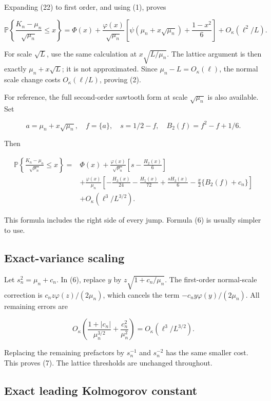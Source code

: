 \documentclass[
  11pt,
]{article}
\begin{document}
Expanding (22) to first order, and using (1), proves

\[
\mathbb P\left\{\frac{K_n-\mu_n}{\sqrt{\mu_n}}\le x\right\}
=\Phi(x)+\frac{\varphi(x)}{\sqrt{\mu_n}}
\left[\psi(\mu_n+x\sqrt{\mu_n})+\frac{1-x^2}{6}\right]
+O_\kappa(\ell^2/L).
\tag{25}
\]

For scale \(\sqrt L\), use the same calculation at \(x\sqrt{L/\mu_n}\).
The lattice argument is then exactly \(\mu_n+x\sqrt L\); it is not
approximated. Since \(\mu_n-L=O_\kappa(\ell)\), the normal scale change
costs \(O_\kappa(\ell/L)\), proving (2).

For reference, the full second-order sawtooth form at scale
\(\sqrt{\mu_n}\) is also available. Set

\[
a=\mu_n+x\sqrt{\mu_n},\quad f=\{a\},\quad s=1/2-f,
\quad B_2(f)=f^2-f+1/6.
\]

Then

\[
\begin{split}
\mathbb P\left\{\frac{K_n-\mu_n}{\sqrt{\mu_n}}\le x\right\}
={}&\Phi(x)+\frac{\varphi(x)}{\sqrt{\mu_n}}
\left[s-\frac{H_2(x)}6\right]\\
&+\frac{\varphi(x)}{\mu_n}
\left[-\frac{H_3(x)}{24}-\frac{H_5(x)}{72}
+\frac{sH_3(x)}6-\frac x2\{B_2(f)+c_n\}\right]\\
&+O_\kappa(\ell^3/L^{3/2}).
\end{split}
\tag{26}
\]

This formula includes the right side of every jump. Formula (6) is
usually simpler to use.

\subsection{Exact-variance scaling}\label{exact-variance-scaling}

Let \(s_n^2=\mu_n+c_n\). In (6), replace \(y\) by
\(z\sqrt{1+c_n/\mu_n}\). The first-order normal-scale correction is
\(c_n z\varphi(z)/(2\mu_n)\), which cancels the term
\(-c_n y\varphi(y)/(2\mu_n)\). All remaining errors are

\[
O_\kappa\left(\frac{1+|c_n|}{\mu_n^{3/2}}
+\frac{c_n^2}{\mu_n^2}\right)
=O_\kappa(\ell^3/L^{3/2}).
\]

Replacing the remaining prefactors by \(s_n^{-1}\) and \(s_n^{-2}\) has
the same smaller cost. This proves (7). The lattice thresholds are
unchanged throughout.

\subsection{Exact leading Kolmogorov
constant}\label{exact-leading-kolmogorov-constant}
\end{document}
